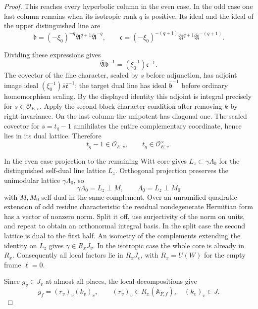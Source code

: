 \begin{proof}
This reaches every hyperbolic column in the even case. In the odd
case one last column remains when its isotropic rank \(q\) is positive.
Its ideal and the ideal of the upper distinguished line are
\[
 \mathfrak b=(-\xi_0)^{-q}\mathfrak A^{q+1}\bar{\mathfrak A}^{-q},
 \qquad
 \mathfrak c=(-\xi_0)^{-(q+1)}
           \mathfrak A^{q+1}\bar{\mathfrak A}^{-(q+1)}.
\]

Dividing these expressions gives
\[
 \bar{\mathfrak A}\mathfrak b^{-1}=(\xi_0^{-1})\mathfrak c^{-1}.
\]
 The covector of the line character,
scaled by \(s\) before adjunction, has adjoint image ideal
\((\xi_0^{-1})\bar s\bar{\mathfrak c}^{-1}\);
the target dual line has ideal \(\bar{\mathfrak b}^{-1}\) before
ordinary homomorphism scaling. By the displayed identity this
adjoint is integral precisely for \(s\in\mathcal O_{E,v}\).
Apply the second-block character condition after removing \(k\)
by right invariance. On the last column the unipotent has diagonal
one. The scaled covector for \(s=t_q-1\) annihilates the entire
complementary coordinate, hence lies in its dual lattice. Therefore
\[
        t_q-1\in\mathcal O_{E,v},\qquad t_q\in\mathcal O_{E,v}^{\times}.
\]

In the even case projection to the remaining Witt core gives
\(L_z\subset\gamma\Lambda_0\) for the distinguished self-dual line
lattice \(L_z\). Orthogonal projection preserves the unimodular
lattice \(\gamma\Lambda_0\), so
\[
 \gamma\Lambda_0=L_z\perp M,\qquad \Lambda_0=L_z\perp M_0
\]
with \(M,M_0\) self-dual in the same complement. Over an unramified
quadratic extension of odd residue characteristic the residual
nondegenerate Hermitian form has a vector of nonzero norm. Split
it off, use surjectivity of the norm on units, and repeat to obtain
an orthonormal integral basis. In the split case the second lattice
is dual to the first half. An isometry of the complements extending
the identity on \(L_z\) gives \(\gamma\in R_xJ_v\). In the isotropic
case the whole core is already in \(R_x\). Consequently all local
factors lie in \(R_xJ_v\), with \(R_x=U(W)\) for the empty frame \(\ell=0\).

Since \(g_v\in J_v\) at almost all places, the local decompositions give
\[
 g_f=(r_v)_v(k_v)_v,\qquad (r_v)_v\in R_x(\mathbb A_{F,f}),\quad(k_v)_v\in J.
\]



\end{proof}
